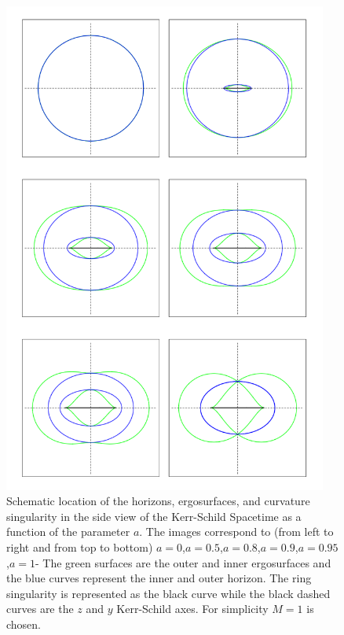   \begin{figure}[htp!]  
\begin{center}
 \centerline{\includegraphics[width=0.95\textwidth]{img/Chapter1/erg2.png}}
 \end{center}
 \vspace{-1.5cm}
 \caption{Schematic location of the horizons, ergosurfaces, and curvature singularity in the side view of the Kerr-Schild Spacetime as a function of the parameter $a$. The images correspond to (from left to right and from top to bottom) $a=0$,$a=0.5$,$a=0.8$,$a=0.9$,$a=0.95$,$a=1$- The green surfaces are the outer and inner ergosurfaces and the blue curves represent the inner and outer horizon. The ring singularity is represented as the black curve while the black dashed curves are the $z$ and $y$ Kerr-Schild axes. For simplicity $M=1$ is chosen.}
 \label{fig:ergo2}
\end{figure} 
